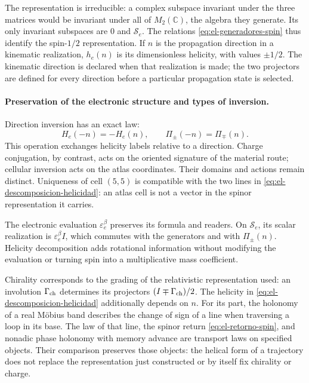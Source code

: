 The representation is irreducible: a complex subspace invariant under
the three matrices would be invariant under all of \(M_2(\mathbb C)\), the
algebra they generate. Its only invariant subspaces are \(0\) and
\(\mathscr S_e\). The relations
\eqref{eq:el-generadores-spin} thus identify the spin-\(1/2\)
representation. If \(n\) is the propagation direction in a
kinematic realization, \(h_e(n)\) is its dimensionless helicity, with
values \(\pm1/2\). The kinematic direction is declared when that
realization is made; the two projectors are defined for every direction
before a particular propagation state is selected.

\paragraph{Preservation of the electronic structure and types of inversion.}
Direction inversion has an exact law:
\[
 H_e(-n)=-H_e(n),\qquad \Pi_\pm(-n)=\Pi_\mp(n).
\]
This operation exchanges helicity labels relative to a
direction. Charge conjugation, by contrast, acts on the oriented
signature of the material route; cellular inversion acts on the
atlas coordinates. Their domains and actions remain distinct.
Uniqueness of cell \((5,5)\) is compatible with the two lines in
\eqref{eq:el-descomposicion-helicidad}: an atlas cell is not a
vector in the spinor representation it carries.

The electronic evaluation \(\varepsilon_e^\beta\) preserves its
formula and readers. On \(\mathscr S_e\), its scalar realization
is \(\varepsilon_e^\beta I\), which commutes with the generators and with
\(\Pi_\pm(n)\). Helicity decomposition adds rotational
information without modifying the evaluation or turning spin into a
multiplicative mass coefficient.

Chirality corresponds to the grading of the relativistic representation
used: an involution \(\Gamma_{\rm ch}\) determines its
projectors \((I\mp\Gamma_{\rm ch})/2\). The helicity in
\eqref{eq:el-descomposicion-helicidad} additionally depends on \(n\).
For its part, the holonomy of a real Möbius band describes the change
of sign of a line when traversing a loop in its base. The law of that line,
the spinor return \eqref{eq:el-retorno-spin}, and nonadic phase holonomy
with memory advance are transport laws on specified
objects. Their comparison preserves those objects: the helical form
of a trajectory does not replace the representation just
constructed or by itself fix chirality or charge.
